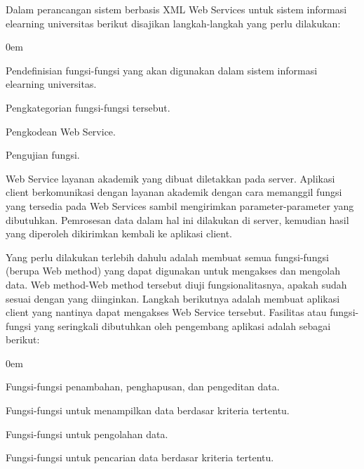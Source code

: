 \documentclass{jtetiproposalskripsi}
\begin{document}
Dalam perancangan sistem berbasis  XML  Web Services untuk sistem informasi elearning universitas berikut disajikan langkah-langkah yang perlu dilakukan:

\vspace{-0.5cm}

\begin{enumerate}[a.]
\begin{singlespace}
\itemsep0em
\item Pendefinisian fungsi-fungsi yang akan digunakan dalam sistem informasi elearning universitas.
\item Pengkategorian fungsi-fungsi tersebut. 
\item Pengkodean Web Service.
\item Pengujian fungsi. 
\end{singlespace}
\end{enumerate}

Web  Service  layanan  akademik  yang  dibuat  diletakkan  pada  server.   Aplikasi client  berkomunikasi  dengan  layanan  akademik  dengan cara  memanggil fungsi yang  tersedia  pada   Web Services sambil  mengirimkan  parameter-parameter yang  dibutuhkan.  Pemrosesan  data  dalam  hal  ini  dilakukan  di  server,  kemudian hasil yang diperoleh dikirimkan kembali ke aplikasi client.  

Yang perlu dilakukan terlebih dahulu adalah membuat semua fungsi-fungsi (berupa Web method) yang dapat digunakan untuk mengakses dan mengolah data.  Web method-Web method tersebut diuji fungsionalitasnya, apakah sudah sesuai dengan yang diinginkan. Langkah berikutnya adalah membuat aplikasi client yang nantinya dapat mengakses Web Service  tersebut.
Fasilitas atau fungsi-fungsi yang seringkali dibutuhkan oleh pengembang aplikasi adalah sebagai berikut: 
\vspace{-0.5cm}

\begin{enumerate}[a.]
\begin{singlespace}
\itemsep0em
\item Fungsi-fungsi penambahan, penghapusan, dan pengeditan data.
\item Fungsi-fungsi untuk menampilkan data berdasar kriteria tertentu.
\item Fungsi-fungsi untuk pengolahan data. 
\item Fungsi-fungsi untuk pencarian data berdasar kriteria tertentu.
\end{singlespace}
\end{enumerate}
\end{document}
